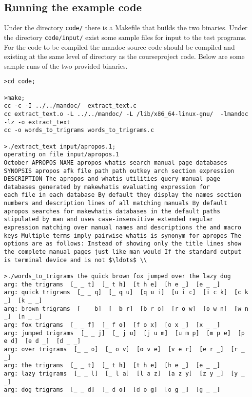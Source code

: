 \documentclass{report}
\begin{document}
\subsection*{Running the example code}
Under the directory {\tt code/} there is a Makefile that builds the two binaries. Under the directory {\tt code/input/} exist some sample files for
input to the test programs. For the code to be compiled the mandoc source code should be compiled and existing at the same level of directory as the courseproject code.
Below are some sample runs of the two provided binaries.

\begin{lstlisting}
>cd code;

>make;
cc -c -I ../../mandoc/  extract_text.c
cc extract_text.o -L ../../mandoc/ -L /lib/x86_64-linux-gnu/  -lmandoc -lz -o extract_text
cc -o words_to_trigrams words_to_trigrams.c

>./extract_text input/apropos.1;
operating on file input/apropos.1
October APROPOS NAME apropos whatis search manual page databases SYNOPSIS apropos afk file path path outkey arch section expression DESCRIPTION The apropos and whatis utilities query manual page databases generated by makewhatis evaluating expression for
each file in each database By default they display the names section numbers and description lines of all matching manuals By default apropos searches for makewhatis databases in the default paths stipulated by man and uses case-insensitive extended regular expression matching over manual names and descriptions the and macro keys Multiple terms imply pairwise whatis is synonym for apropos The options are as follows: Instead of showing only the title lines show the complete manual pages just like man would If the standard output is terminal device and is not $\ldots$ \\

>./words_to_trigrams the quick brown fox jumped over the lazy dog
arg: the trigrams  [_ _ t]  [_ t h]  [t h e]  [h e _]  [e _ _]
arg: quick trigrams  [_ _ q]  [_ q u]  [q u i]  [u i c]  [i c k]  [c k _]  [k _ _]
arg: brown trigrams  [_ _ b]  [_ b r]  [b r o]  [r o w]  [o w n]  [w n _]  [n _ _]
arg: fox trigrams  [_ _ f]  [_ f o]  [f o x]  [o x _]  [x _ _]
arg: jumped trigrams  [_ _ j]  [_ j u]  [j u m]  [u m p]  [m p e]  [p e d]  [e d _]  [d _ _]
arg: over trigrams  [_ _ o]  [_ o v]  [o v e]  [v e r]  [e r _]  [r _ _]
arg: the trigrams  [_ _ t]  [_ t h]  [t h e]  [h e _]  [e _ _]
arg: lazy trigrams  [_ _ l]  [_ l a]  [l a z]  [a z y]  [z y _]  [y _ _]
arg: dog trigrams  [_ _ d]  [_ d o]  [d o g]  [o g _]  [g _ _]

\end{lstlisting}
\end{document}
